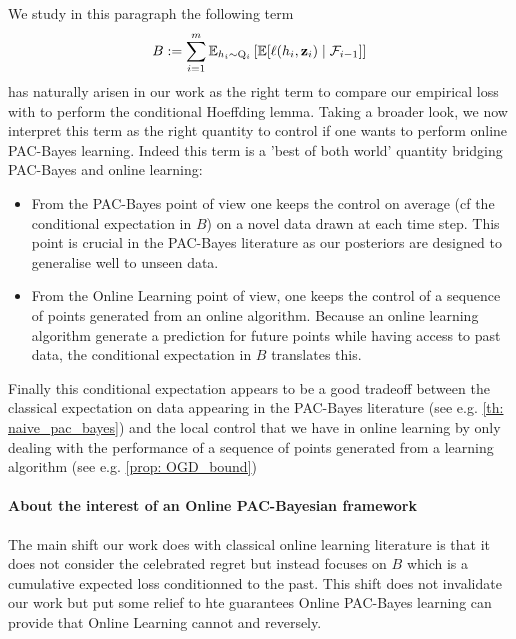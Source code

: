 \begin{noaddcontents}
 We study in this paragraph the following term
  $$B:=\sum_{i=1}^m \mathbb{E}_{h_i\sim \mathrm{Q}_{i}}\left[ \mathbb{E}[\ell(h_i,\mathbf{z}_i) \mid \mathcal{F}_{i-1}]    \right]$$ has naturally arisen in our work as the right term to compare our empirical loss with to perform the conditional Hoeffding lemma.
 Taking a broader look, we now interpret this term as the right quantity to control if one wants to perform online PAC-Bayes learning. Indeed this term is a 'best of both world' quantity bridging PAC-Bayes and online learning:

 \begin{itemize}
   \item From the PAC-Bayes point of view one keeps the control on average (cf the conditional expectation in $B$) on a novel data drawn at each time step. This point is crucial in the PAC-Bayes literature as our posteriors are designed to generalise well to unseen data.
   \item From the Online Learning point of view, one keeps the control of a sequence of points generated from an online algorithm. Because an online learning algorithm generate a prediction for future points while having access to past data, the conditional expectation in $B$ translates this.
 \end{itemize}

Finally this conditional expectation appears to be a good tradeoff between the classical expectation on data appearing in the PAC-Bayes literature (see e.g. \cref{th: naive_pac_bayes}) and the local control that we have in online learning by only dealing with the performance of a sequence of points generated from a learning algorithm (see e.g. \cref{prop: OGD_bound})


\paragraph{About the interest of an Online PAC-Bayesian framework}
The main shift our work does with classical online learning literature is that it does not consider the celebrated regret but instead focuses on $B$ which is a cumulative expected loss conditionned to the past. This shift does not invalidate our work but put some relief to hte guarantees Online PAC-Bayes learning can provide that Online Learning cannot and reversely.


\end{noaddcontents}
